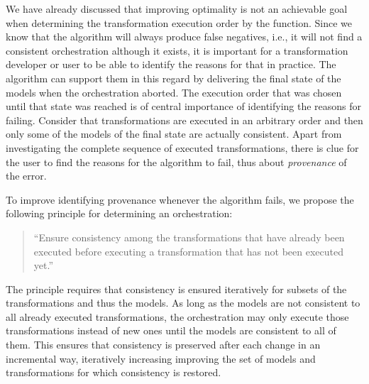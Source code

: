 We have already discussed that improving optimality is not an achievable goal when determining the transformation execution order by the  function.
Since we know that the algorithm will always produce false negatives, i.e., it will not find a consistent orchestration although it exists, it is important for a transformation developer or user to be able to identify the reasons for that in practice.
The algorithm can support them in this regard by delivering the final state of the models when the orchestration aborted.
The execution order that was chosen until that state was reached is of central importance of identifying the reasons for failing.
Consider that transformations are executed in an arbitrary order and then only some of the models of the final state are actually consistent.
Apart from investigating the complete sequence of executed transformations, there is clue for the user to find the reasons for the algorithm to fail, thus about \emph{provenance} of the error.

To improve identifying provenance whenever the algorithm fails, we propose the following principle for determining an orchestration:
\begin{quote}
    \enquote{Ensure consistency among the transformations that have already been executed before executing a transformation that has not been executed yet.} \cite{gleitze2020orchestration}
\end{quote}
The principle requires that consistency is ensured iteratively for subsets of the transformations and thus the models.
As long as the models are not consistent to all already executed transformations, the orchestration may only execute those transformations instead of new ones until the models are consistent to all of them.
This ensures that consistency is preserved after each change in an incremental way, iteratively increasing improving the set of models and transformations for which consistency is restored.

